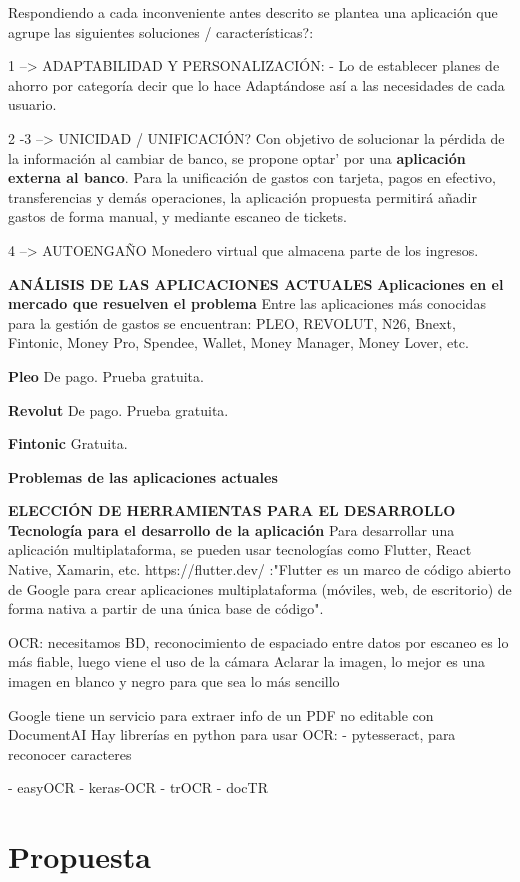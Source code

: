 Respondiendo a cada inconveniente antes descrito se plantea una aplicación que 
agrupe las siguientes soluciones / características?:


1 --> ADAPTABILIDAD Y PERSONALIZACIÓN: 
- Lo de establecer planes de ahorro por categoría decir que lo hace
Adaptándose así a las necesidades de cada usuario.

2 -3 --> UNICIDAD / UNIFICACIÓN?
Con objetivo de solucionar la pérdida de la información al cambiar de banco, 
se propone optar' por una \textbf{aplicación externa al banco}. Para la unificación de gastos 
con tarjeta, pagos en efectivo, transferencias y demás operaciones, la 
aplicación propuesta permitirá añadir gastos de forma manual, y mediante 
escaneo de tickets. 



4 --> AUTOENGAÑO
Monedero virtual que almacena parte de los ingresos.


\textbf{ANÁLISIS DE LAS APLICACIONES ACTUALES}
\textbf{Aplicaciones en el mercado que resuelven el problema}
Entre las aplicaciones más conocidas para la gestión de gastos se encuentran:
PLEO, REVOLUT, N26, Bnext, Fintonic, Money Pro, Spendee, Wallet, Money Manager, Money Lover, etc.

\textbf{Pleo} De pago. Prueba gratuita.

\textbf{Revolut} De pago. Prueba gratuita.

\textbf{Fintonic} Gratuita. 

\textbf{Problemas de las aplicaciones actuales}







\textbf{ELECCIÓN DE HERRAMIENTAS PARA EL DESARROLLO}
\textbf{Tecnología para el desarrollo de la aplicación}
Para desarrollar una aplicación multiplataforma, se pueden usar tecnologías como Flutter, React Native, Xamarin, etc.
https://flutter.dev/ :"Flutter es un marco de código abierto de Google para crear aplicaciones multiplataforma (móviles, 
web, de escritorio) de forma nativa a partir de una única base de código".


OCR:
necesitamos BD, reconocimiento de espaciado entre datos
por escaneo es lo más fiable, luego viene el uso de la cámara
Aclarar la imagen, lo mejor es una imagen en blanco y negro para que sea lo más sencillo

Google tiene un servicio para extraer info de un PDF no editable con DocumentAI
Hay librerías en python para usar OCR:
    - pytesseract, para reconocer caracteres 

- easyOCR
- keras-OCR
- trOCR
- docTR

\section{Propuesta}

